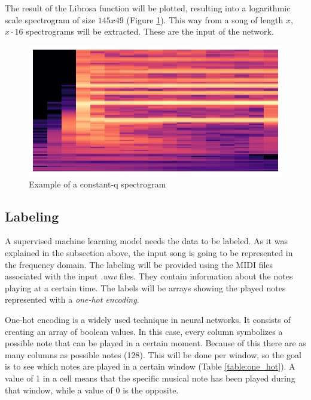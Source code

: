 The result of the Librosa function will be plotted, resulting into a logarithmic scale spectrogram of size $145x49$ (Figure \ref{fig:q_spec}). This way from a song of length $x$, $x \cdot 16$ spectrograms will be extracted. These are the input of the network.  
	
\begin{figure}[h!]
	\caption[Example of a constant-q spectrogram]{ Example of a constant-q spectrogram }
	\centering
	\label{fig:q_spec}
	\includegraphics[width=1\textwidth, height=\textheight, keepaspectratio]{"resources/q_spec"}
\end{figure}

\subsection{Labeling}
A supervised machine learning model needs the data to be labeled. As it was explained in the subsection above, the input song is going to be represented in the frequency domain. The labeling will be provided using the MIDI files associated with the input \textit{.wav} files. They contain information about the notes playing at a certain time. The labels will be arrays showing the played notes represented with a \textit{one-hot encoding}.
\par

One-hot encoding is a widely used technique in neural networks. It consists of creating an array of boolean values. \cite{one-hot} In this case, every column symbolizes a possible note that can be played in a certain moment. Because of this there are as many columns as possible notes (128). This will be done per window, so the goal is to see which notes are played in a certain window (Table \ref{table:one_hot}). A value of 1 in a cell means that the specific musical note has been played during that window, while a value of 0 is the opposite.

